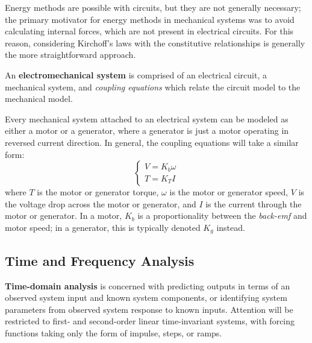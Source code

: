 Energy methods are possible with circuits, but they are not generally necessary; the primary motivator for energy methods in mechanical systems was to avoid calculating internal forces, which are not present in electrical circuits. For this reason, considering Kirchoff's laws with the constitutive relationships is generally the more straightforward approach.
\vspace{1em}

\begin{framed}
An \textbf{electromechanical system} is comprised of an electrical circuit, a mechanical system, and \textit{coupling equations} which relate the circuit model to the mechanical model. 

Every mechanical system attached to an electrical system can be modeled as either a motor or a generator, where a generator is just a motor operating in reversed current direction. In general, the coupling equations will take a similar form: \[\begin{cases}
    V = K_b \omega\\
    T = K_T I
\end{cases}\] where $T$ is the motor or generator torque, $\omega$ is the motor or generator speed, $V$ is the voltage drop across the motor or generator, and $I$ is the current through the motor or generator. In a motor, $K_b$ is a proportionality between the \textit{back-emf} and motor speed; in a generator, this is typically denoted $K_g$ instead.
\end{framed}

\subsection{Time and Frequency Analysis}

\textbf{Time-domain analysis} is concerned with predicting outputs in terms of an observed system input and known system components, or identifying system parameters from observed system response to known inputs. Attention will be restricted to first- and second-order linear time-invariant systems, with forcing functions taking only the form of impulse, steps, or ramps.

